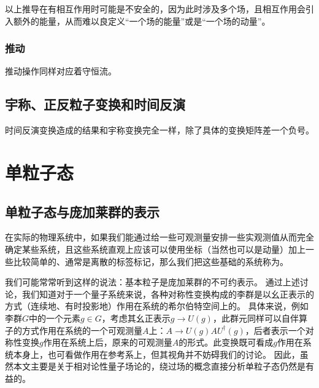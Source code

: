 以上推导在有相互作用时可能是不安全的，因为此时涉及多个场，且相互作用会引入额外的能量，从而难以良定义“一个场的能量”或是“一个场的动量”。

\subsubsection{推动}

推动操作同样对应着守恒流。

\subsection{宇称、正反粒子变换和时间反演}

时间反演变换造成的结果和宇称变换完全一样，除了具体的变换矩阵差一个负号。





\section{单粒子态}\label{sec:single-particle}

\subsection{单粒子态与庞加莱群的表示}

在实际的物理系统中，如果我们能通过给一些可观测量安排一些实观测值从而完全确定某些系统，且这些系统直观上应该可以使用坐标（当然也可以是动量）加上一些比较简单的、通常是离散的标签标记，那么我们把这些基础的系统称为。

我们可能常常听到这样的说法：基本粒子是庞加莱群的不可约表示。
通过上述讨论，我们知道对于一个量子系统来说，各种对称性变换构成的李群是以幺正表示的方式（连续地、有时投影地）作用在系统的希尔伯特空间上的。
具体来说，例如李群$G$中的一个元素$g\in G$，考虑其幺正表示$g\to U(g)$，此群元同样可以自伴算子的方式作用在系统的一个可观测量$A$上：$A\to U(g)AU^\dagger(g)$，后者表示一个对称性变换$g$作用在系统上后，原来的可观测量$A$的形式。此变换既可看成$g$作用在系统本身上，也可看做作用在参考系上，但其视角并不妨碍我们的讨论。
因此，虽然本文主要是关于相对论性量子场论的，绕过场的概念直接分析单粒子态仍然是有益的。

